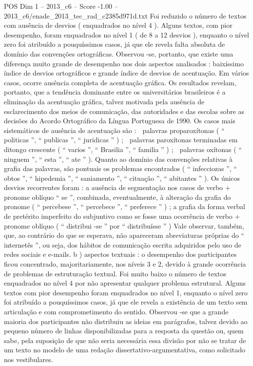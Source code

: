 \begin{textsample}{POS Dim 1 – 2013\_c6 – Score -1.00 – 2013\_c6/enade\_2013\_tec\_rad\_c2385d971d.txt}
Foi reduzido o número de textos com ausência de desvios ( enquadrados no nível 4 ).
Alguns textos, com pior desempenho, foram enquadrados no nível 1 ( de 8 a 12 desvios ), enquanto o nível zero foi atribuído a pouquíssimos casos, já que ele revela falta absoluta de domínio das convenções ortográficas.
Observou -se, portanto, que existe uma diferença muito grande de desempenho nos dois aspectos analisados : baixíssimo índice de desvios ortográficos e grande índice de desvios de acentuação.
Em vários casos, ocorre ausência completa de acentuação gráfica.
Os resultados revelam, portanto, que a tendência dominante entre os universitários brasileiros é a eliminação da acentuação gráfica, talvez motivada pela ausência de esclarecimento dos meios de comunicação, das autoridades e das escolas sobre as decisões do Acordo Ortográfico da Língua Portuguesa de 1990.
Os casos mais sistemáticos de ausência de acentuação são :  palavras proparoxítonas ( “ politicas ”, “ publicas ”, “ juridicas ” ) ;  palavras paroxítonas terminadas em ditongo crescente ( “ varios ”, “ Brasilia ”, “ familia ” ) ;  palavras oxítonas ( “ ninguem ”, “ esta ”, “ ate ” ).
Quanto ao domínio das convenções relativas à grafia das palavras, são pontuais os problemas encontrados ( “ infecciozas ”, “ obtos ”, “ hipedemia ”, “ saniamento ”, “ cituação ”, “ abitantes ” ).
Os únicos desvios recorrentes foram : a ausência de segmentação nos casos de verbo + pronome oblíquo “ se ”, combinada, eventualmente, à alteração da grafia do pronome ( “ percebese ”, “ percebece ”, “ preferece ” ) ; a grafia da forma verbal de pretérito imperfeito do subjuntivo como se fosse uma ocorrência de verbo + pronome oblíquo ( “ distribui -se ” por “ distribuísse ” ) Vale observar, também, que, ao contrário do que se esperava, não apareceram abreviaturas próprias do “ internetês ”, ou seja, dos hábitos de comunicação escrita adquiridos pelo uso de redes sociais e e-mails. b ) aspectos textuais : o desempenho dos participantes ficou concentrado, majoritariamente, nos níveis 3 e 2, devido à grande ocorrência de problemas de estruturação textual.
Foi muito baixo o número de textos enquadrados no nível 4 por não apresentar qualquer problema estrutural.
Alguns textos com pior desempenho foram enquadrados no nível 1, enquanto o nível zero foi atribuído a pouquíssimos casos, já que ele revela a existência de um texto sem articulação e com comprometimento do sentido.
Observou -se que a grande maioria dos participantes não distribuiu as ideias em parágrafos, talvez devido ao pequeno número de linhas disponibilizadas para a resposta da questão ou, quem sabe, pela suposição de que não seria necessária essa divisão por não se tratar de um texto no modelo de uma redação dissertativo-argumentativa, como solicitado nos vestibulares.

\end{textsample}
